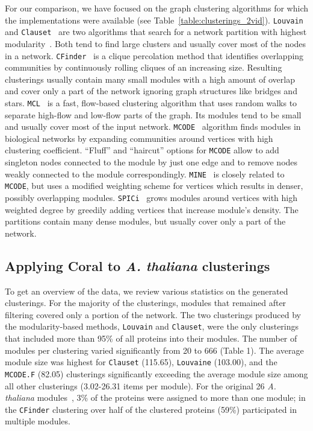 \documentclass[12pt]{cmuthesis}
\newcommand\Coral{Coral\xspace}
\newcommand{\Athal}{\textit{A. thaliana}\xspace}
\begin{document}

  For our comparison, we have focused on the graph clustering algorithms
  for which the implementations were available (see
  Table~\ref{table:clusterings_2vid}). \texttt{Louvain}~\cite{Blondel2008} and
  \texttt{Clauset}~\cite{Clauset2004} are two algorithms that search for a
  network partition with highest modularity~\cite{newman06}. Both tend to find
  large clusters and usually cover most of the nodes in a network.
  \texttt{CFinder}~\cite{Adamcsek2006} is a clique percolation method that
  identifies overlapping communities by continuously rolling cliques of an
  increasing size. Resulting clusterings usually contain many small modules with
  a high amount of overlap and cover only a part of the network ignoring
  graph structures like bridges and stars. \texttt{MCL}~\cite{VanDongen2000} is a
  fast, flow-based clustering algorithm that uses random walks to separate
  high-flow and low-flow parts of the graph. Its modules tend to be small and
  usually cover most of the input network. \texttt{MCODE}~\cite{Bader2003}
  algorithm finds modules in biological networks by expanding communities around
  vertices with high clustering coefficient. ``Fluff'' and ``haircut'' options for
  \texttt{MCODE} allow to add singleton nodes connected to the module
  by just one edge and to remove nodes weakly connected to the module
  correspondingly. \texttt{MINE}~\cite{Rhrissorrakrai2011} is closely related to
  \texttt{MCODE}, but uses a modified weighting scheme for vertices which results
  in denser, possibly overlapping modules.
  \texttt{SPICi}~\cite{Jiang2010} grows modules around vertices with high
  weighted degree by greedily adding vertices that increase module's density. The
  partitions contain many dense modules, but usually cover only a part of the
  network.

  \subsection{Applying \Coral to \Athal clusterings}


  To get an overview of the data, we review various statistics on
  the generated clusterings. For the majority of the clusterings, modules
  that remained after filtering covered only a portion of the network. The two
  clusterings produced by the modularity-based methods, \texttt{Louvain} and
  \texttt{Clauset}, were the only clusterings that included more than 95\% of all
  proteins into their modules. The number of modules per clustering varied
  significantly from 20 to 666 (Table 1).
  The average module size was highest for \texttt{Clauset} (115.65),
  \texttt{Louvaine} (103.00), and the \texttt{MCODE.F} (82.05) clusterings
  significantly exceeding the average module size among all other clusterings
  (3.02-26.31 items per module). For the original 26 \Athal
  modules~\cite{Vidal2011}, 3\% of the proteins were assigned to more than one
  module; in the \texttt{CFinder} clustering over half of the clustered proteins
  (59\%) participated in multiple modules.
\end{document}

